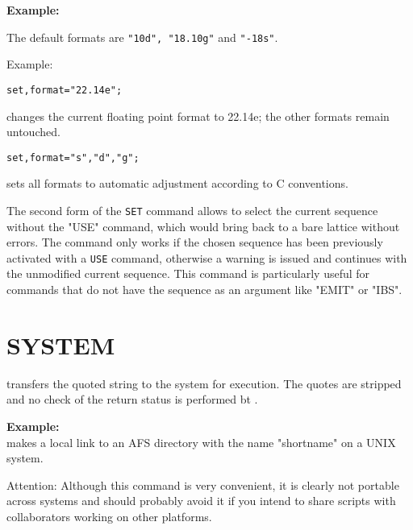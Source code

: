 {\bf Example:}\\



The default formats are {\tt "10d", "18.10g"} and {\tt "-18s"}.

Example: 
\begin{verbatim}
set,format="22.14e";
\end{verbatim} 
changes the current floating point format to 22.14e; the other formats remain untouched. 
\begin{verbatim}
set,format="s","d","g";
\end{verbatim} 
sets all formats to automatic adjustment according to C conventions. 



The second form of the {\tt SET} command allows to select the
current sequence without the "USE" command, which would
bring back to a bare lattice without errors. The command only works
if the chosen sequence has been previously activated with a {\tt USE} command,
otherwise a warning is issued and \madx continues with the
unmodified current sequence. This command is particularly useful for
commands that do not have the sequence as an argument like "EMIT" or
"IBS". 



\section{SYSTEM}
\label{sec:system}
transfers the quoted string to the system for execution. The quotes are
stripped and no check of the return status is performed bt \madx.

{\bf Example:}\\ 
makes a local link to an AFS directory with the name "shortname" on a
UNIX system. 

Attention: Although this command is very convenient, it is clearly not portable
across systems and should probably avoid it if you intend to share \madx scripts with
collaborators working on other platforms. 

